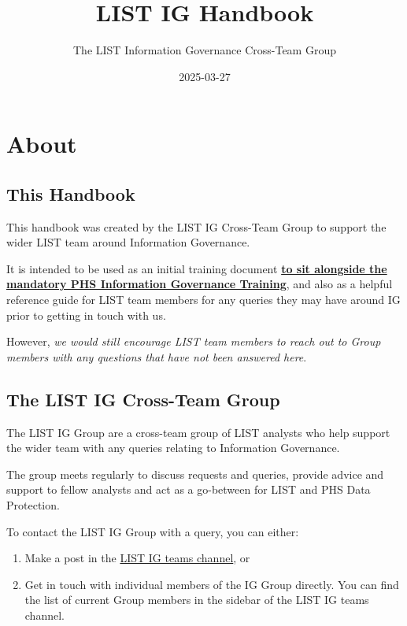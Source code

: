 \documentclass[
]{book}
\title{LIST IG Handbook}
\author{The LIST Information Governance Cross-Team Group}
\date{2025-03-27}
\begin{document}
\maketitle

{
\setcounter{tocdepth}{1}
\tableofcontents
}
\hypertarget{about}{%
\chapter{About}\label{about}}

\hypertarget{this-handbook}{%
\section{This Handbook}\label{this-handbook}}

This handbook was created by the LIST IG Cross-Team Group to support the wider LIST team around Information Governance.

It is intended to be used as an initial training document \protect\hyperlink{training}{\textbf{to sit alongside the mandatory PHS Information Governance Training}}, and also as a helpful reference guide for LIST team members for any queries they may have around IG prior to getting in touch with us.

However, \emph{we would still encourage LIST team members to reach out to Group members with any questions that have not been answered here}.

\hypertarget{the-list-ig-cross-team-group}{%
\section{The LIST IG Cross-Team Group}\label{the-list-ig-cross-team-group}}

The LIST IG Group are a cross-team group of LIST analysts who help support the wider team with any queries relating to Information Governance.

The group meets regularly to discuss requests and queries, provide advice and support to fellow analysts and act as a go-between for LIST and PHS Data Protection.

To contact the LIST IG Group with a query, you can either:

\begin{enumerate}
\def\labelenumi{\arabic{enumi}.}
\item
  Make a post in the \href{https://teams.microsoft.com/l/channel/19\%3A9a435ecaaa6c4ca8b6a8313223116114\%40thread.tacv2/Information\%20Governance?groupId=3e609872-2e51-443b-a14c-e1216a3636d0\&tenantId=10efe0bd-a030-4bca-809c-b5e6745e499a}{LIST IG teams channel}, or
\item
  Get in touch with individual members of the IG Group directly. You can find the list of current Group members in the sidebar of the LIST IG teams channel.
\end{enumerate}
\end{document}
